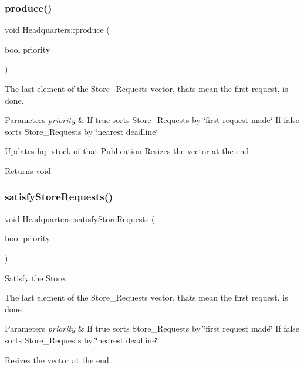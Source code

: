 \subsubsection{\texorpdfstring{produce()}{produce()}}
{\footnotesize\ttfamily void Headquarters\+::produce (\begin{DoxyParamCaption}\item[{bool}]{priority }\end{DoxyParamCaption})}



The last element of the Store\+\_\+\+Requests vector, that\textquotesingle{}s mean the first request, is done. 


\begin{DoxyParams}{Parameters}
{\em priority} & If true sorts Store\+\_\+\+Requests by \char`\"{}first request made\char`\"{} If false sorts Store\+\_\+\+Requests by \char`\"{}nearest deadline\char`\"{}\\
\hline
\end{DoxyParams}
Updates hq\+\_\+stock of that \hyperlink{class_publication}{Publication} Resizes the vector at the end

\begin{DoxyReturn}{Returns}
void 
\end{DoxyReturn}
\mbox{\label{class_headquarters_a41ad767a1dac88d048c8584a81fbabf2}} 
\subsubsection{\texorpdfstring{satisfy\+Store\+Requests()}{satisfyStoreRequests()}}
{\footnotesize\ttfamily void Headquarters\+::satisfy\+Store\+Requests (\begin{DoxyParamCaption}\item[{bool}]{priority }\end{DoxyParamCaption})}



Satisfy the \hyperlink{class_store}{Store}. 

The last element of the Store\+\_\+\+Requests vector, that\textquotesingle{}s mean the first request, is done


\begin{DoxyParams}{Parameters}
{\em priority} & If true sorts Store\+\_\+\+Requests by \char`\"{}first request made\char`\"{} If false sorts Store\+\_\+\+Requests by \char`\"{}nearest deadline\char`\"{}\\
\hline
\end{DoxyParams}
Resizes the vector at the end

